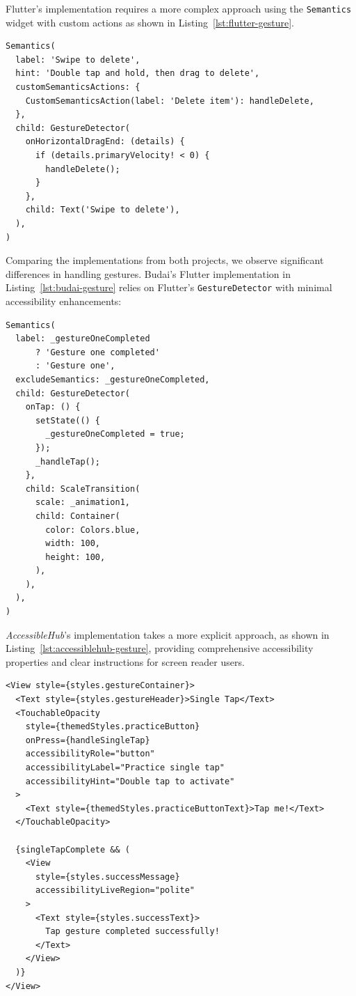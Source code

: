 Flutter's implementation requires a more complex approach using the \texttt{Semantics} widget with custom actions as shown in Listing~\ref{lst:flutter-gesture}.

\begin{lstlisting}[style=DartStyle, caption=Accessible gesture handler in Flutter, label=lst:flutter-gesture]
Semantics(
  label: 'Swipe to delete',
  hint: 'Double tap and hold, then drag to delete',
  customSemanticsActions: {
    CustomSemanticsAction(label: 'Delete item'): handleDelete,
  },
  child: GestureDetector(
    onHorizontalDragEnd: (details) {
      if (details.primaryVelocity! < 0) {
        handleDelete();
      }
    },
    child: Text('Swipe to delete'),
  ),
)
\end{lstlisting}

\pagebreak

Comparing the implementations from both projects, we observe significant differences in handling gestures. Budai's Flutter implementation in Listing~\ref{lst:budai-gesture} relies on Flutter's \texttt{GestureDetector} with minimal accessibility enhancements:

\begin{lstlisting}[style=DartStyle, caption=Gesture handling in Budai's Flutter implementation, label=lst:budai-gesture]
Semantics(
  label: _gestureOneCompleted 
      ? 'Gesture one completed' 
      : 'Gesture one',
  excludeSemantics: _gestureOneCompleted,
  child: GestureDetector(
    onTap: () {
      setState(() {
        _gestureOneCompleted = true;
      });
      _handleTap();
    },
    child: ScaleTransition(
      scale: _animation1,
      child: Container(
        color: Colors.blue,
        width: 100,
        height: 100,
      ),
    ),
  ),
)
\end{lstlisting}

\pagebreak

\textit{AccessibleHub}'s implementation takes a more explicit approach, as shown in Listing~\ref{lst:accessiblehub-gesture}, providing comprehensive accessibility properties and clear instructions for screen reader users.

\begin{lstlisting}[style=ReactNativeStyle, caption=Gesture handling in \textit{AccessibleHub}'s React Native implementation, label=lst:accessiblehub-gesture]
<View style={styles.gestureContainer}>
  <Text style={styles.gestureHeader}>Single Tap</Text>
  <TouchableOpacity
    style={themedStyles.practiceButton}
    onPress={handleSingleTap}
    accessibilityRole="button"
    accessibilityLabel="Practice single tap"
    accessibilityHint="Double tap to activate"
  >
    <Text style={themedStyles.practiceButtonText}>Tap me!</Text>
  </TouchableOpacity>
  
  {singleTapComplete && (
    <View 
      style={styles.successMessage} 
      accessibilityLiveRegion="polite"
    >
      <Text style={styles.successText}>
        Tap gesture completed successfully!
      </Text>
    </View>
  )}
</View>
\end{lstlisting}

